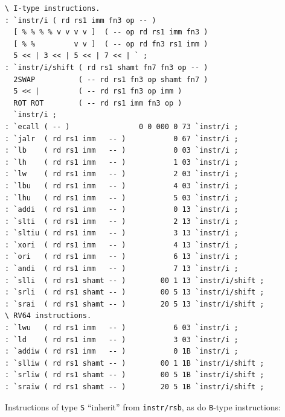 \documentclass[a4paper,12pt,final]{article}
\begin{document}
\fontsize{9pt}{9.000000pt}\selectfont
\begin{verbatim}
\ I-type instructions.
: `instr/i ( rd rs1 imm fn3 op -- )
  [ % % % % v v v v ]  ( -- op rd rs1 imm fn3 )
  [ % %         v v ]  ( -- op rd fn3 rs1 imm )
  5 << | 3 << | 5 << | 7 << | ` ;
: `instr/i/shift ( rd rs1 shamt fn7 fn3 op -- )
  2SWAP          ( -- rd rs1 fn3 op shamt fn7 )
  5 << |         ( -- rd rs1 fn3 op imm )
  ROT ROT        ( -- rd rs1 imm fn3 op )
  `instr/i ;
: `ecall ( -- )                0 0 000 0 73 `instr/i ;
: `jalr  ( rd rs1 imm   -- )           0 67 `instr/i ;
: `lb    ( rd rs1 imm   -- )           0 03 `instr/i ;
: `lh    ( rd rs1 imm   -- )           1 03 `instr/i ;
: `lw    ( rd rs1 imm   -- )           2 03 `instr/i ;
: `lbu   ( rd rs1 imm   -- )           4 03 `instr/i ;
: `lhu   ( rd rs1 imm   -- )           5 03 `instr/i ;
: `addi  ( rd rs1 imm   -- )           0 13 `instr/i ;
: `slti  ( rd rs1 imm   -- )           2 13 `instr/i ;
: `sltiu ( rd rs1 imm   -- )           3 13 `instr/i ;
: `xori  ( rd rs1 imm   -- )           4 13 `instr/i ;
: `ori   ( rd rs1 imm   -- )           6 13 `instr/i ;
: `andi  ( rd rs1 imm   -- )           7 13 `instr/i ;
: `slli  ( rd rs1 shamt -- )        00 1 13 `instr/i/shift ;
: `srli  ( rd rs1 shamt -- )        00 5 13 `instr/i/shift ;
: `srai  ( rd rs1 shamt -- )        20 5 13 `instr/i/shift ;
\ RV64 instructions.
: `lwu   ( rd rs1 imm   -- )           6 03 `instr/i ;
: `ld    ( rd rs1 imm   -- )           3 03 `instr/i ;
: `addiw ( rd rs1 imm   -- )           0 1B `instr/i ;
: `slliw ( rd rs1 shamt -- )        00 1 1B `instr/i/shift ;
: `srliw ( rd rs1 shamt -- )        00 5 1B `instr/i/shift ;
: `sraiw ( rd rs1 shamt -- )        20 5 1B `instr/i/shift ;
\end{verbatim}
\normalsize

Instructions of type \texttt{S} ``inherit'' from \texttt{instr/rsb}, as do \texttt{B}-type instructions:
\end{document}
